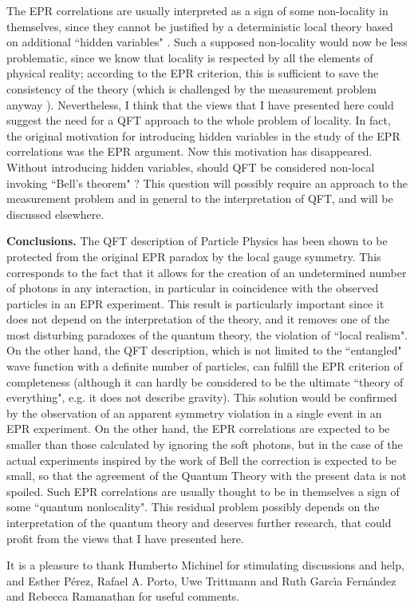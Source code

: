\documentclass[aps,prl,showkeys,showpacs,preprint,groupedaddress]{revtex4}
\begin{document}
The EPR correlations are usually interpreted as a sign of some
non-locality in themselves, since they cannot be justified by a
deterministic local theory based on additional ``hidden variables"
\cite{Bell,Laloe}. Such a supposed non-locality would now be less
problematic, since we know that locality is respected by all the
elements of physical reality; according to the EPR criterion, this
is sufficient to save the consistency of the theory (which is
challenged by the measurement problem anyway \cite{Laloe}).
Nevertheless, I think that the views that I have presented here
could suggest the need for a QFT approach to the whole problem of
locality. In fact, the original motivation for introducing hidden
variables in the study of the EPR correlations was the EPR
argument. Now this motivation has disappeared. Without introducing
hidden variables, should QFT be considered non-local invoking
``Bell's theorem" \cite{Bell,Laloe}? This question will possibly
require an approach to the measurement problem and in general to
the interpretation of QFT, and will be discussed elsewhere.

{\bf Conclusions.} The QFT description of Particle Physics has
been shown to be protected from the original EPR paradox by the
local gauge symmetry. This corresponds to the fact that it allows
for the creation of an undetermined number of photons in any
interaction, in particular in coincidence with the observed
particles in an EPR experiment. This result is particularly
important since it does not depend on the interpretation of the
theory, and it removes one of the most disturbing paradoxes of the
quantum theory, the violation of ``local realism". On the other
hand, the QFT description, which is not limited to the
``entangled" wave function with a definite number of particles,
can fulfill the EPR criterion of completeness (although it can
hardly be considered to be the ultimate ``theory of everything",
e.g. it does not describe gravity). This solution would be
confirmed by the observation of an apparent symmetry violation in
a single event in an EPR experiment. On the other hand, the EPR
correlations are expected to be smaller than those calculated by
ignoring the soft photons, but in the case of the actual
experiments inspired by the work of Bell the correction is
expected to be small, so that the agreement of the Quantum Theory
with the present data is not spoiled. Such EPR correlations are
usually thought to be in themselves a sign of some ``quantum
nonlocality". This residual problem possibly depends on the
interpretation of the quantum theory and deserves further
research, that could profit from the views that I have presented
here.

It is a pleasure to thank Humberto Michinel for stimulating
discussions and help, and Esther P\'erez, Rafael A. Porto, Uwe
Trittmann and Ruth Garc\'\i a Fern\'andez and Rebecca Ramanathan
for useful comments.


\end{document}
